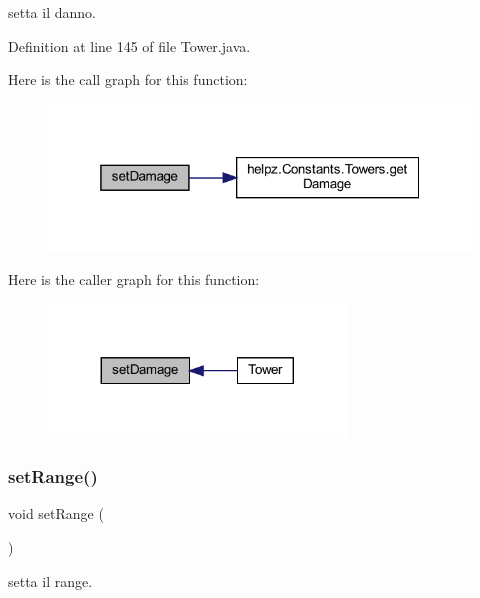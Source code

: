 setta il danno. 



Definition at line 145 of file Tower.\+java.

Here is the call graph for this function\+:\nopagebreak
\begin{figure}[H]
\begin{center}
\leavevmode
\includegraphics[width=319pt]{classtowers_1_1_tower_a342d428cb4c655ed4d92a2c5be287e5d_cgraph}
\end{center}
\end{figure}
Here is the caller graph for this function\+:\nopagebreak
\begin{figure}[H]
\begin{center}
\leavevmode
\includegraphics[width=224pt]{classtowers_1_1_tower_a342d428cb4c655ed4d92a2c5be287e5d_icgraph}
\end{center}
\end{figure}
\mbox{\label{classtowers_1_1_tower_abfc55d980923d42001e5aefda77849f9}} 
\subsubsection{\texorpdfstring{set\+Range()}{setRange()}}
{\footnotesize\ttfamily void set\+Range (\begin{DoxyParamCaption}{ }\end{DoxyParamCaption})\hspace{0.3cm}{\ttfamily [private]}}



setta il range. 



